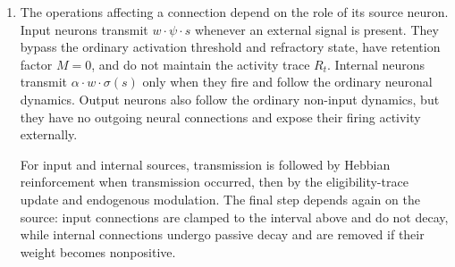 \documentclass[12pt,a4paper]{article}
\begin{document}
\begin{enumerate}
	\item The operations affecting a connection depend on the role of its source neuron. Input neurons transmit $w \cdot \psi \cdot s$ whenever an external signal is present. They bypass the ordinary activation threshold and refractory state, have retention factor $M = 0$, and do not maintain the activity trace $R_t$. Internal neurons transmit $\alpha \cdot w \cdot \sigma(s)$ only when they fire and follow the ordinary neuronal dynamics. Output neurons also follow the ordinary non-input dynamics, but they have no outgoing neural connections and expose their firing activity externally.

	For input and internal sources, transmission is followed by Hebbian reinforcement when transmission occurred, then by the eligibility-trace update and endogenous modulation. The final step depends again on the source: input connections are clamped to the interval above and do not decay, while internal connections undergo passive decay and are removed if their weight becomes nonpositive.

	\begin{figure}[H]
		\centering
\end{figure}
\end{enumerate}
\end{document}
